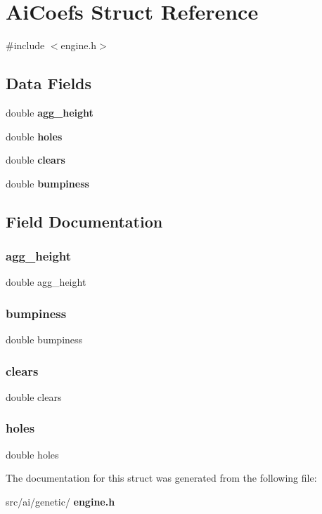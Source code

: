 \section{Ai\+Coefs Struct Reference}
\label{structAiCoefs}


{\ttfamily \#include $<$engine.\+h$>$}

\subsection*{Data Fields}
\begin{DoxyCompactItemize}
\item 
double \textbf{ agg\+\_\+height}
\item 
double \textbf{ holes}
\item 
double \textbf{ clears}
\item 
double \textbf{ bumpiness}
\end{DoxyCompactItemize}


\subsection{Field Documentation}
\mbox{\label{structAiCoefs_a0691df3d11342de203475e6993146f76}} 
\subsubsection{agg\+\_\+height}
{\footnotesize\ttfamily double agg\+\_\+height}

\mbox{\label{structAiCoefs_a7a634ecd67e00fc4b19a86046ad95154}} 
\subsubsection{bumpiness}
{\footnotesize\ttfamily double bumpiness}

\mbox{\label{structAiCoefs_a7e11e19ab08623daaac58bd77d5f80c4}} 
\subsubsection{clears}
{\footnotesize\ttfamily double clears}

\mbox{\label{structAiCoefs_acf9e4d84dfc5d65f5a85fc4dc3a5fadb}} 
\subsubsection{holes}
{\footnotesize\ttfamily double holes}



The documentation for this struct was generated from the following file\+:\begin{DoxyCompactItemize}
\item 
src/ai/genetic/\textbf{ engine.\+h}\end{DoxyCompactItemize}
